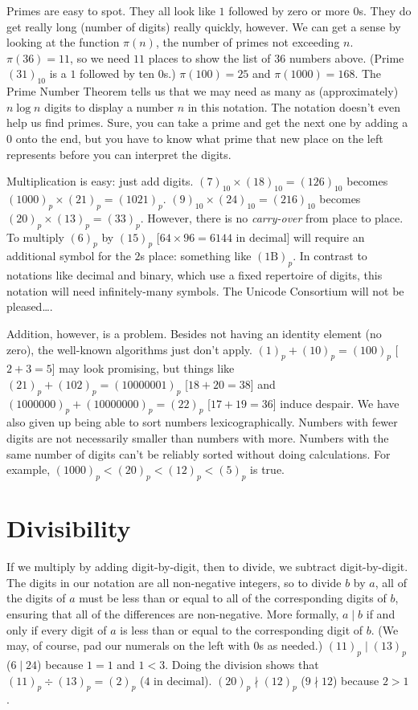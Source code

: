 \documentclass[12pt]{article}
\begin{document}
Primes are easy to spot. They all look like $1$ followed by zero or more $0$s. They do get really long (number of digits) really quickly, however. We can get a sense by looking at the function $\pi(n)$, the number of primes not exceeding $n$. $\pi(36) = 11$, so we need $11$ places to show the list of $36$ numbers above. (Prime $(31)_{10}$ is a $1$ followed by ten $0$s.) $\pi(100) = 25$ and $\pi(1000) = 168$. The Prime Number Theorem tells us that we may need as many as (approximately) $n \log n$ digits to display a number $n$ in this notation. The notation doesn't even help us find primes. Sure, you can take a prime and get the next one by adding a $0$ onto the end, but you have to know what prime that new place on the left represents before you can interpret the digits.

Multiplication is easy: just add digits. $(7)_{10} \times (18)_{10} = (126)_{10}$ becomes $(1000)_p \times (21)_p = (1021)_p$. $(9)_{10} \times (24)_{10} = (216)_{10}$ becomes $(20)_p \times (13)_p = (33)_p$. However, there is no \textit{carry-over} from place to place. To multiply $(6)_p$ by $(15)_p$ [$64 \times 96 = 6144$ in decimal] will require an additional symbol for the $2$s place: something like $(1\mathrm{B})_p$. In contrast to notations like decimal and binary, which use a fixed repertoire of digits, this notation will need infinitely-many symbols. The Unicode Consortium will not be pleased\ldots.

Addition, however, is a problem. Besides not having an identity element (no zero), the well-known algorithms just don't apply. $(1)_p + (10)_p = (100)_p$ [$2+3=5$] may look promising, but things like $(21)_p + (102)_p = (10000001)_p$ [$18+20=38$] and $(1000000)_p + (10000000)_p = (22)_p$ [$17+19=36$] induce despair. We have also given up being able to sort numbers lexicographically. Numbers with fewer digits are not necessarily smaller than numbers with more. Numbers with the same number of digits can't be reliably sorted without doing calculations. For example, $(1000)_p < (20)_p < (12)_p < (5)_p$ is true.

\section*{Divisibility}
\noindent If we multiply by adding digit-by-digit, then to divide, we subtract digit-by-digit. The digits in our notation are all non-negative integers, so to divide $b$ by $a$, all of the digits of $a$ must be less than or equal to all of the corresponding digits of $b$, ensuring that all of the differences are non-negative. More formally, $a \mid b$ if and only if every digit of $a$ is less than or equal to the corresponding digit of $b$. (We may, of course, pad our numerals on the left with $0$s as needed.) $(11)_p \mid (13)_p$ ($6 \mid 24$) because $1 = 1$ and $1 < 3$. Doing the division shows that $(11)_p \div (13)_p = (2)_p$ ($4$ in decimal). $(20)_p \nmid (12)_p$ ($9 \nmid 12$) because $2 > 1$.
\end{document}
